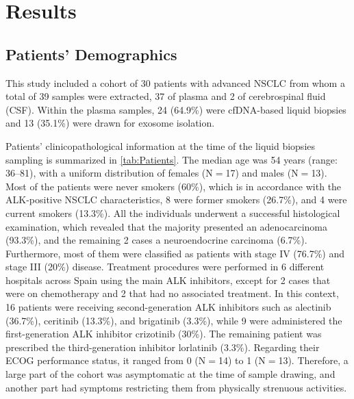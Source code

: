 \chapter{Results}

\section{Patients' Demographics}

This study included a cohort of 30 patients with advanced NSCLC from whom a total of 39 samples were extracted, 37 of plasma and 2 of cerebrospinal fluid (CSF). Within the plasma samples, 24 (64.9\%) were cfDNA-based liquid biopsies and 13 (35.1\%) were drawn for exosome isolation.

Patients' clinicopathological information at the time of the liquid biopsies sampling is summarized in \autoref{tab:Patients}. The median age was 54 years (range: 36–81), with a uniform distribution of females (N$=$17) and males (N$=$13). Most of the patients were never smokers (60\%), which is in accordance with the ALK-positive NSCLC characteristics, 8 were former smokers (26.7\%), and 4 were current smokers (13.3\%). All the individuals underwent a successful histological examination, which revealed that the majority presented an adenocarcinoma (93.3\%), and the remaining 2 cases a neuroendocrine carcinoma (6.7\%). Furthermore, most of them were classified as patients with stage IV (76.7\%) and stage III (20\%) disease. Treatment procedures were performed in 6 different hospitals across Spain using the main ALK inhibitors, except for 2 cases that were on chemotherapy and 2 that had no associated treatment. In this context, 16 patients were receiving second-generation ALK inhibitors such as alectinib (36.7\%), ceritinib (13.3\%), and brigatinib (3.3\%), while 9 were administered the first-generation ALK inhibitor crizotinib (30\%). The remaining patient was prescribed the third-generation inhibitor lorlatinib (3.3\%). Regarding their ECOG performance status, it ranged from 0 (N$=$14) to 1 (N$=$13). Therefore, a large part of the cohort was asymptomatic at the time of sample drawing, and another part had symptoms restricting them from physically strenuous activities.

